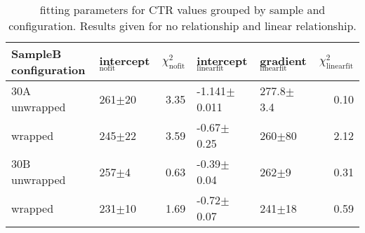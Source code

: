 \begin{table}
\caption{\label{tab:doiresults} fitting parameters for CTR values grouped by sample and configuration. Results given for no relationship and linear relationship.}
\begin{tabular}{llrllr}
\hline
SampleB configuration & intercept$_\text{nofit}$ &  $\chi^2_\text{nofit}$ & intercept$_\text{linearfit}$ & gradient$_\text{linearfit}$ &  $\chi^2_\text{linearfit}$ \\
\hline
30A     unwrapped     &      261$\pm$20 &                   3.35 &    -1.141$\pm$0.011 &      277.8$\pm$3.4 &                    0.10 \\
        wrapped       &      245$\pm$22 &                   3.59 &      -0.67$\pm$0.25 &       260$\pm$80 &                    2.12 \\
30B     unwrapped     &       257$\pm$4 &                   0.63 &      -0.39$\pm$0.04 &          262$\pm$9 &                    0.31 \\
        wrapped       &      231$\pm$10 &                   1.69 &      -0.72$\pm$0.07 &         241$\pm$18 &                    0.59 \\
\hline
\end{tabular}
\end{table}